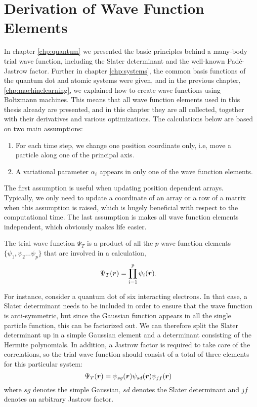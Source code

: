 \chapter{Derivation of Wave Function Elements} \label{chp:WFE}
In chapter \eqref{chp:quantum} we presented the basic principles behind a many-body trial wave function, including the Slater determinant and the well-known Padé-Jastrow factor. Further in chapter \eqref{chp:systems}, the common basis functions of the quantum dot and atomic systems were given, and in the previous chapter, \eqref{chp:machinelearning}, we explained how to create wave functions using Boltzmann machines. This means that all wave function elements used in this thesis already are presented, and in this chapter they are all collected, together with their derivatives and various optimizations. The calculations below are based on two main assumptions:
\begin{enumerate}
	\item For each time step, we change one position coordinate only, i.e, move a particle along one of the principal axis.
	\item A variational parameter $\alpha_i$ appears in only one of the wave function elements.
\end{enumerate}
The first assumption is useful when updating position dependent arrays. Typically, we only need to update a coordinate of an array or a row of a matrix when this assumption is raised, which is hugely beneficial with respect to the computational time. The last assumption is makes all wave function elements independent, which obviously makes life easier. 

The trial wave function $\Psi_T$ is a product of all the $p$ wave function elements $\{\psi_1, \psi_2\hdots\psi_p\}$ that are involved in a calculation,
\begin{equation}
\Psi_T(\boldsymbol{{r}}) = \prod_{i=1}^p\psi_i(\boldsymbol{{r}}).
\label{eq:elementproduct}
\end{equation}

For instance, consider a quantum dot of six interacting electrons. In that case, a Slater determinant needs to be included in order to ensure that the wave function is anti-symmetric, but since the Gaussian function appears in all the single particle function, this can be factorized out. We can therefore split the Slater determinant up in a simple Gaussian element and a determinant consisting of the Hermite polynomials. In addition, a Jastrow factor is required to take care of the correlations, so the trial wave function should consist of a total of three elements for this particular system:
\begin{equation*}
\Psi_T(\boldsymbol{{r}})=\psi_{sg}(\boldsymbol{{r}})\psi_{sd}(\boldsymbol{{r}})\psi_{jf}(\boldsymbol{{r}})
\end{equation*}
where $sg$ denotes the simple Gaussian, $sd$ denotes the Slater determinant and $jf$ denotes an arbitrary Jastrow factor. 

